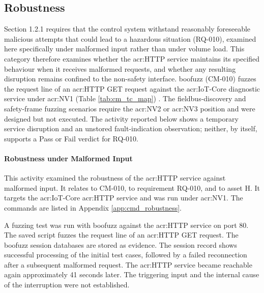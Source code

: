 \subsection{Robustness}
\label{subsec:cat_robustness}
Section 1.2.1 requires that the control system withstand reasonably foreseeable malicious attempts that could lead to a hazardous situation (RQ-010), examined here specifically under malformed input rather than under volume load. This category therefore examines whether the \gls{acr:HTTP} service maintains its specified behaviour when it receives malformed requests, and whether any resulting disruption remains confined to the non-safety interface. boofuzz (CM-010) fuzzes the request line of an \gls{acr:HTTP} GET request against the \gls{acr:IoT}-Core diagnostic service under \gls{acr:NV1} (Table \ref{tab:cm_tc_map}) \cite{boofuzz_quickstart}. The fieldbus-discovery and safety-frame fuzzing scenarios require the \gls{acr:NV2} or \gls{acr:NV3} position and were designed but not executed. The activity reported below shows a temporary service disruption and an unstored fault-indication observation; neither, by itself, supports a Pass or Fail verdict for RQ-010.

\paragraph{Robustness under Malformed Input}
\label{subsec:res_robustness}
This activity examined the robustness of the \gls{acr:HTTP} service against malformed input. It relates to CM-010, to requirement RQ-010, and to asset H. It targets the \gls{acr:IoT}-Core \gls{acr:HTTP} service and was run under \gls{acr:NV1}. The commands are listed in Appendix \ref{app:cmd_robustness}.

A fuzzing test was run with boofuzz against the \gls{acr:HTTP} service on port 80. The saved script fuzzes the request line of an \gls{acr:HTTP} GET request. The boofuzz session databases are stored as evidence.
The session record shows successful processing of the initial test cases, followed by a failed reconnection after a subsequent malformed request. The \gls{acr:HTTP} service became reachable again approximately 41 seconds later. The triggering input and the internal cause of the interruption were not established.

